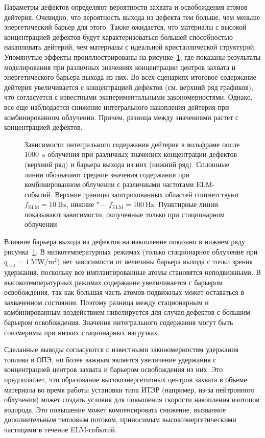 Параметры дефектов определяют вероятности захвата и освобождения атомов дейтерия. Очевидно, что вероятность выхода из дефекта тем больше, чем меньше энергетический барьер для этого. Также ожидается, что материалы с высокой концентрацией дефектов будут характеризоваться большей способностью накапливать дейтерий, чем материалы с идеальной кристаллической структурой. Упомянутые эффекты проиллюстрированы на рисунке~\cref{fig:ch3/eta_Edt_var}, где показаны результаты моделирования при различных значениях концентрации центров захвата и энергетического барьера выхода из них. Во всех сценариях итоговое содержание дейтерия увеличивается с концентрацией дефектов (см. верхний ряд графиков), что согласуется с известными экспериментальными закономерностями. Однако, все еще наблюдается снижение интегрального накопления дейтерия при комбинированном облучении. Причем, разница между значениями растет с концентрацией дефектов.
\begin{figure}[ht]
	\caption{Зависимости интегрального содержания дейтерия в вольфраме после \SI{1000}{\second} облучения при различных значениях концентрации дефектов (верхний ряд) и барьера выхода из них (нижний ряд). Сплошные линии обозначают средние значения содержания при комбинированном облучении с различными частотами ELM-событий. Верхние границы заштрихованных областей соответствуют \(f_\mathrm{ELM} = \SI{10}{\hertz}\), нижние "--- \(f_\mathrm{ELM} = \SI{100}{\hertz}\). Пунктирные линии показывают зависимости, полученные только при стационарном облучении}\label{fig:ch3/eta_Edt_var}
\end{figure}

Влияние барьера выхода из дефектов на накопление показано в нижнем ряду рисунка~\cref{fig:ch3/eta_Edt_var}. В низкотемпературных режимах (только стационарное облучение при $q_{\mathrm{stat}}=\SI{1}{\mega\watt\per\meter\squared}$) нет зависимости от величины барьера выхода с точки зрения удержания, поскольку все имплантированные атомы становятся неподвижными. В высокотемпературных режимах содержание увеличивается с барьером освобождения, так как большая часть атомов подвижных может оставаться в захваченном состоянии. Поэтому разница между стационарным и комбинированным воздействием нивелируется для случая дефектов с большим барьером освобождения. Значения интегрального содержания могут быть соизмеримы при низких стационарных нагрузках.

Сделанные выводы согласуются с известными закономерностям удержания топлива в ОПЭ, но более важным является увеличение удержания с концентрацией центров захвата и барьером освобождения из них. Это предполагает, что образование высокоэнергетичных центров захвата в объеме материала во время работы установки типа ИТЭР (например, из-за нейтронного облучения) может создать условия для повышения скорости накопления изотопов водорода. Это повышение может компенсировать снижение, вызванное дополнительным тепловым потоком, приносимым высокоэнергетическими частицами в течение ELM-событий.

